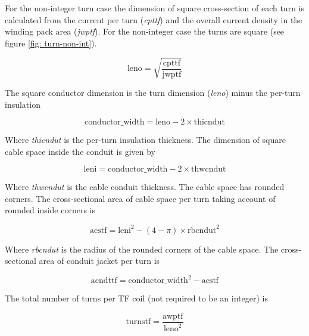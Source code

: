 \documentclass[hidelinks]{article}
\numberwithin{equation}{section}
\begin{document}
    For the non-integer turn case the dimension of square cross-section of each turn is 
    calculated from the current per turn (\emph{cpttf}) and the overall current density 
    in the winding pack area (\emph{jwptf}). For the non-integer case the turns are 
    square (see figure \ref{fig: turn-non-int}).

    \begin{equation}
        \text{leno} = \sqrt{\frac{\text{cpttf}}{\text{jwptf}}}
    \end{equation}

    \noi The square conductor dimension is the turn dimension (\emph{leno}) minus 
    the per-turn insulation
    
    \begin{equation}
        \text{conductor\_width} = \text{leno} - 2 \times \text{thicndut}
    \end{equation}

    \noi Where \emph{thicndut} is the per-turn insulation thickness. The dimension 
    of square cable space inside the conduit is given by

    \begin{equation}
        \text{leni} = \text{conductor\_width} - 2 \times \text{thwcndut}
    \end{equation}

    \noi Where \emph{thwcndut} is the cable conduit thickness. The cable space has 
    rounded corners. The cross-sectional area of cable space per turn taking account of 
    rounded inside corners is

    \begin{equation}
        \text{acstf} = \text{leni}^2 - (4-\pi) \times \text{rbcndut}^2
    \end{equation}

    \noi Where \emph{rbcndut} is the radius of the rounded corners of the cable 
    space. The cross-sectional area of conduit jacket per turn is

    \begin{equation}
        \text{acndttf} = \text{conductor\_width}^2 - \text{acstf}
    \end{equation}

    \noi The total number of turns per TF coil (not required to be an integer) is 
    
    \begin{equation}
        \text{turnstf} = \frac{\text{awptf}}{\text{leno}^2}
    \end{equation}
\end{document}
